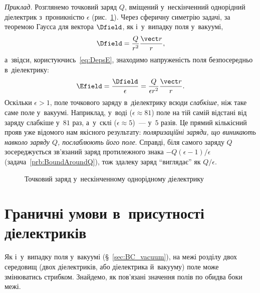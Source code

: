\emph{Приклад.} Розглянемо точковий заряд $Q$, вміщений у~нескінченний однорідний
діелектрик з~проникністю $\epsilon$ (рис.~\ref{pic:PointChargeDielectric}). Через сферичну
симетрію задачі, за теоремою Гаусса для вектора $\Dfield$, як і~у~випадку поля у~вакуумі,
\begin{equation*}
	\Dfield = \frac{Q}{r^2}\frac{\vect r}{r},
\end{equation*}
а~звідси, користуючись~\eqref{eq:DepsE}, знаходимо напруженість поля безпосередньо
в~діелектрику:
\begin{equation*}
	\Efield = \frac{\Dfield}{\epsilon} = \frac{Q}{\epsilon r^2}\frac{\vect r}{r}.
\end{equation*}
Оскільки $\epsilon > 1$, поле точкового заряду в~діелектрику всюди \emph{слабкіше}, ніж
таке саме поле у~вакуумі. Наприклад, у~воді ($\epsilon \approx 81$) поле на тій самій
відстані від заряду слабкіше у~$81$ раз, а~у~склі ($\epsilon \approx 5$)~--- у~$5$ разів.
Це прямий кількісний прояв уже відомого нам якісного результату: \emph{поляризаційні
	заряди, що виникають навколо заряду $Q$, послаблюють його поле}. Справді, біля самого
заряду $Q$ зосереджується зв'язаний заряд протилежного знака $-Q(\epsilon-1)/\epsilon$
(задача~\ref{prb:BoundAroundQ}), тож здалеку заряд \enquote{виглядає} як $Q/\epsilon$.

\begin{figure}\centering
	\caption{Точковий заряд у~нескінченному однорідному
		діелектрику\label{pic:PointChargeDielectric}}
\end{figure}


\section{Граничні умови в~присутності діелектриків}\hypertarget{dielectric-boundary-conditions}{}


Як і~у~випадку поля у~вакуумі
(\S~\ref{sec:BC_vacuum}), на межі розділу двох середовищ (двох діелектриків, або
діелектрика й~вакууму) поле може змінюватись стрибком. Знайдемо, як пов'язані значення
полів по обидва боки межі.


